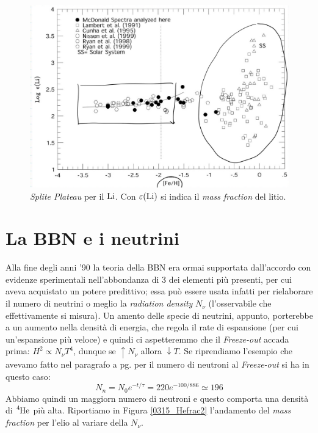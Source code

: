 \begin{figure}[h]
    \centering
    \includegraphics[scale=0.25]{Immagini/0315_LiH.png}
    \caption{\textit{Splite Plateau} per il $\ce{Li}$. Con $\varepsilon (\ce{Li})$ si indica il \textit{mass fraction} del litio.}
    \label{0315_LiH}
\end{figure}
\newpage
\section{La BBN e i neutrini}
Alla fine degli anni '90 la teoria della BBN era ormai supportata dall'accordo con evidenze sperimentali nell'abbondanza di 3 dei elementi più presenti, %
per cui aveva acquistato un potere predittivo; essa può essere usata infatti per rielaborare il numero di neutrini o meglio la \textit{radiation density} $N_\nu$ (l'osservabile che effettivamente si misura). Un amento delle specie di neutrini, appunto, porterebbe a un aumento nella densità di energia, che regola il rate di espansione (per cui un'espansione più veloce) e quindi ci aspetteremmo che il \textit{Freeze-out} accada prima: $H^2 \propto N_\nu T^4$, dunque se $\uparrow N_\nu $ allora $\downarrow T$. Se riprendiamo l'esempio che avevamo fatto nel paragrafo  a pg. \pageref{a.grandi.linee} per il numero di neutroni al \textit{Freeze-out} si ha in questo caso:
$$N_n = N_0 e^{-t/\tau} = 220 e^{-100/886} \simeq 196$$
Abbiamo quindi un maggiorn numero di neutroni e questo comporta una densità di $\ce{^4He}$ più alta. Riportiamo in Figura \ref{0315_Hefrac2} l'andamento del \textit{mass fraction} per l'elio al variare della $N_\nu$.

